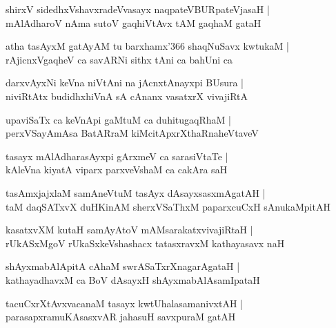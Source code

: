 \begin{shloka}
shirxV sidedhxVshavxradeVvasayx naqpateVBURpateVjasaH |\\
mAlAdharoV nAma sutoV gaqhiVtAvx tAM gaqhaM gataH
\end{shloka}

\begin{shloka}
atha tasAyxM gatAyAM tu barxhamx\char'366 shaqNuSavx kwtukaM |\\
rAjicnxVgaqheV ca savARNi sithx tAni ca bahUni ca 
\end{shloka}

\begin{shloka}
darxvAyxNi keVna niVtAni na jAcnxtAnayxpi BUsura |\\
niviRtAtx budidhxhiVnA sA cAnanx vasatxrX vivajiRtA 
\end{shloka}

\begin{shloka}
upaviSaTx ca keVnApi gaMtuM ca duhitugaqRhaM |\\
perxVSayAmAsa BatARraM kiMcitApxrXthaRnaheVtaveV 
\end{shloka}

\begin{shloka}
tasayx mAlAdharasAyxpi gArxmeV ca sarasiVtaTe |\\
kAleVna kiyatA viparx parxveVshaM ca cakAra saH 
\end{shloka}

\begin{shloka}
tasAmxjajxlaM samAneVtuM tasAyx dAsayxsasxmAgatAH |\\
taM daqSATxvX duHKinAM sherxVSaThxM paparxcuCxH sAnukaMpitAH
\end{shloka}

\begin{shloka}
kasatxvXM kutaH samAyAtoV mAMsarakatxvivajiRtaH |\\
rUkASxMgoV rUkaSxkeVshashacx tatasxravxM kathayasavx naH 
\end{shloka}

\begin{shloka}
shAyxmabAlApitA cAhaM swrASaTxrXnagarAgataH |\\
kathayadhavxM ca BoV dAsayxH shAyxmabAlAsamIpataH
\end{shloka}

\begin{shloka}
tacuCxrXtAvxvacanaM tasayx kwtUhalasamanivxtAH |\\
parasapxramuKAsasxvAR jahasuH savxpuraM gatAH
\end{shloka}

